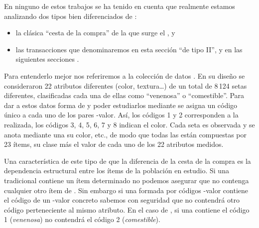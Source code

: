 En ninguno de estos trabajos se ha tenido en cuenta que realmente estamos analizando dos tipos bien diferenciados de \transacciones:
\begin{itemize}
  \item la clásica ``cesta de la compra'' de la que surge el \ARM, y
  \item las transacciones que denominaremos en esta sección ``de tipo II'', y en las siguientes secciones \registro.
\end{itemize}

Para entenderlo mejor nos referiremos a la colección de datos \mushroom. En su diseño se consideraron 22 atributos diferentes (color, textura\ldots) de un total de 8\,124 setas diferentes, clasificadas cada una de ellas como ``venenosa'' o ``comestible''. Para dar a estos datos forma de \transaccion y poder estudiarlos mediante \ARM se asigna un código único a cada uno de los pares \atributo-valor. Así, los códigos 1 y 2 corresponden a la \clasificacion realizada, los códigos 3, 4, 5, 6, 7 y 8 indican el color. Cada seta es observada y se anota mediante una \transaccion su color, etc., de modo que todas las \transacciones están compuestas por 23 ítems, su clase más el valor de cada uno de los 22 atributos medidos.

Una característica de este tipo de \transaccion que la diferencia de la cesta de la compra es la dependencia estructural entre los ítems de la población en estudio. Si una \transaccion tradicional contiene un ítem determinado no podemos asegurar que no contenga cualquier otro ítem de \I. Sin embargo si una \transaccion formada por códigos \atributo-valor contiene el código de un \atributo-valor concreto sabemos con seguridad que no contendrá otro código perteneciente al mismo atributo. En el caso de \mushroom, si una \transaccion contiene el código 1 (\emph{venenosa}) no contendrá el código 2 (\emph{comestible}).

